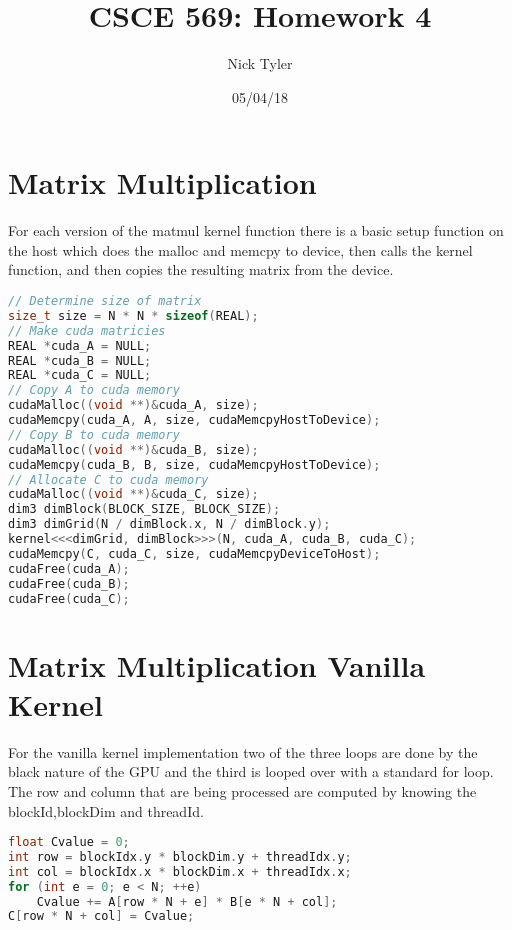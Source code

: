 \documentclass[a4paper]{article}
\title{CSCE 569: Homework 4}
\author{Nick Tyler}
\date{05/04/18}
\begin{document}
\maketitle

\section*{Matrix Multiplication}
For each version of the matmul kernel function there is a basic setup function on the host which does the malloc and memcpy to device, then calls the kernel function, and then copies the resulting matrix from the device.
\begin{lstlisting}[language=C++]
// Determine size of matrix
size_t size = N * N * sizeof(REAL);
// Make cuda matricies
REAL *cuda_A = NULL;
REAL *cuda_B = NULL;
REAL *cuda_C = NULL;
// Copy A to cuda memory
cudaMalloc((void **)&cuda_A, size);
cudaMemcpy(cuda_A, A, size, cudaMemcpyHostToDevice);
// Copy B to cuda memory
cudaMalloc((void **)&cuda_B, size);
cudaMemcpy(cuda_B, B, size, cudaMemcpyHostToDevice);
// Allocate C to cuda memory
cudaMalloc((void **)&cuda_C, size);
dim3 dimBlock(BLOCK_SIZE, BLOCK_SIZE);
dim3 dimGrid(N / dimBlock.x, N / dimBlock.y);
kernel<<<dimGrid, dimBlock>>>(N, cuda_A, cuda_B, cuda_C);
cudaMemcpy(C, cuda_C, size, cudaMemcpyDeviceToHost);
cudaFree(cuda_A);
cudaFree(cuda_B);
cudaFree(cuda_C);
\end{lstlisting}

\section*{Matrix Multiplication Vanilla Kernel}
For the vanilla kernel implementation two of the three loops are done by the black nature of the GPU and the third is looped over with a standard for loop. The row and column that are being processed are computed by knowing the blockId,blockDim and threadId.
\begin{lstlisting}[language=C++]
float Cvalue = 0;
int row = blockIdx.y * blockDim.y + threadIdx.y;
int col = blockIdx.x * blockDim.x + threadIdx.x;
for (int e = 0; e < N; ++e)
	Cvalue += A[row * N + e] * B[e * N + col];
C[row * N + col] = Cvalue;
\end{lstlisting}
\end{document}
